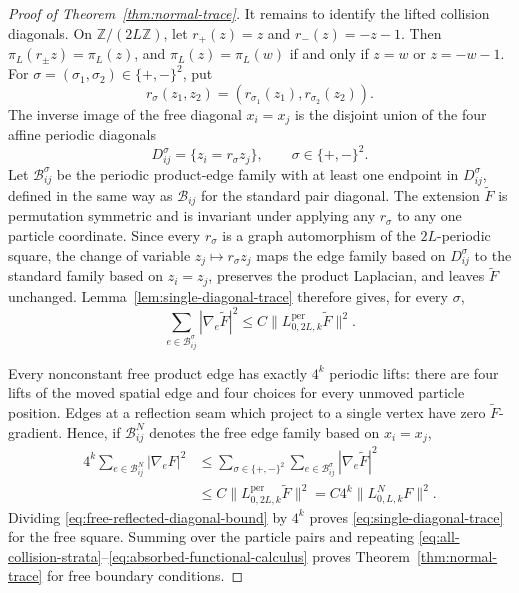 \documentclass[11pt]{article}
\numberwithin{equation}{section}
\theoremstyle{remark}
\newcommand{\1}{\mathbf 1}
\begin{document}
\begin{proof}[Proof of Theorem~\ref{thm:normal-trace}]
It remains to identify the lifted collision diagonals.  On
\(\mathbb Z/(2L\mathbb Z)\), let \(r_+(z)=z\) and
\(r_-(z)=-z-1\).  Then \(\pi_L(r_\pm z)=\pi_L(z)\), and
\(\pi_L(z)=\pi_L(w)\) if and only if \(z=w\) or \(z=-w-1\).
For \(\sigma=(\sigma_1,\sigma_2)\in\{+,-\}^2\), put
\[
 r_\sigma(z_1,z_2)
 =(r_{\sigma_1}(z_1),r_{\sigma_2}(z_2)).
\]
The inverse image of the free diagonal \(x_i=x_j\) is the disjoint union
of the four affine periodic diagonals
\[
 D_{ij}^\sigma=\{z_i=r_\sigma z_j\},
 \qquad \sigma\in\{+,-\}^2.
\]
Let \(\mathcal B_{ij}^\sigma\) be the periodic product-edge family with at
least one endpoint in \(D_{ij}^\sigma\), defined in the same way as
\(\mathcal B_{ij}\) for the standard pair diagonal.
The extension \(\widetilde F\) is permutation symmetric and is invariant
under applying any \(r_\sigma\) to any one particle coordinate.  Since
every \(r_\sigma\) is a graph automorphism of the \(2L\)-periodic square,
the change of variable \(z_j\mapsto r_\sigma z_j\) maps the edge family
based on \(D_{ij}^\sigma\) to the standard family based on \(z_i=z_j\),
preserves the product Laplacian, and leaves \(\widetilde F\) unchanged.
Lemma~\ref{lem:single-diagonal-trace} therefore gives, for every
\(\sigma\),
\begin{equation}
 \sum_{e\in\mathcal B_{ij}^\sigma}
 |\nabla_e\widetilde F|^2
 \leq C\|L_{0,2L,k}^{\mathrm{per}}\widetilde F\|^2.
 \label{eq:affine-reflected-diagonal-bound}
\end{equation}

Every nonconstant free product edge has exactly \(4^k\) periodic lifts:
there are four lifts of the moved spatial edge and four choices for every
unmoved particle position.  Edges at a reflection seam which project to a
single vertex have zero \(\widetilde F\)-gradient.  Hence, if
\(\mathcal B_{ij}^{N}\) denotes the free edge family based on
\(x_i=x_j\),
\begin{align}
 4^k\sum_{e\in\mathcal B_{ij}^{N}}|\nabla_eF|^2
 &\leq \sum_{\sigma\in\{+,-\}^2}
       \sum_{e\in\mathcal B_{ij}^\sigma}
       |\nabla_e\widetilde F|^2 \\
 &\leq C\|L_{0,2L,k}^{\mathrm{per}}\widetilde F\|^2
 =C4^k\|L_{0,L,k}^{N}F\|^2.
 \label{eq:free-reflected-diagonal-bound}
\end{align}
Dividing \eqref{eq:free-reflected-diagonal-bound} by \(4^k\) proves
\eqref{eq:single-diagonal-trace} for the free square.  Summing over
the particle pairs and repeating
\eqref{eq:all-collision-strata}--\eqref{eq:absorbed-functional-calculus}
proves Theorem~\ref{thm:normal-trace} for free boundary conditions.
\end{proof}
\end{document}
